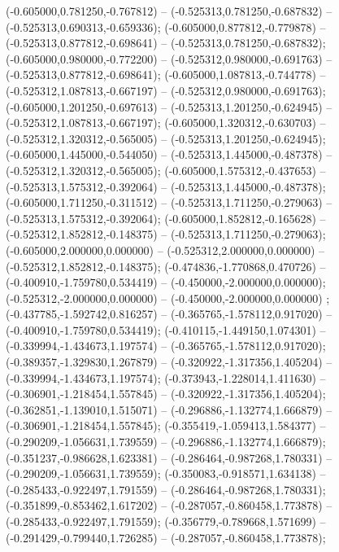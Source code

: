  (-0.605000,0.781250,-0.767812) -- (-0.525313,0.781250,-0.687832) -- (-0.525313,0.690313,-0.659336);
 (-0.605000,0.877812,-0.779878) -- (-0.525313,0.877812,-0.698641) -- (-0.525313,0.781250,-0.687832);
 (-0.605000,0.980000,-0.772200) -- (-0.525312,0.980000,-0.691763) -- (-0.525313,0.877812,-0.698641);
 (-0.605000,1.087813,-0.744778) -- (-0.525312,1.087813,-0.667197) -- (-0.525312,0.980000,-0.691763);
 (-0.605000,1.201250,-0.697613) -- (-0.525313,1.201250,-0.624945) -- (-0.525312,1.087813,-0.667197);
 (-0.605000,1.320312,-0.630703) -- (-0.525312,1.320312,-0.565005) -- (-0.525313,1.201250,-0.624945);
 (-0.605000,1.445000,-0.544050) -- (-0.525313,1.445000,-0.487378) -- (-0.525312,1.320312,-0.565005);
 (-0.605000,1.575312,-0.437653) -- (-0.525313,1.575312,-0.392064) -- (-0.525313,1.445000,-0.487378);
 (-0.605000,1.711250,-0.311512) -- (-0.525313,1.711250,-0.279063) -- (-0.525313,1.575312,-0.392064);
 (-0.605000,1.852812,-0.165628) -- (-0.525312,1.852812,-0.148375) -- (-0.525313,1.711250,-0.279063);
 (-0.605000,2.000000,0.000000) -- (-0.525312,2.000000,0.000000) -- (-0.525312,1.852812,-0.148375);
 (-0.474836,-1.770868,0.470726) -- (-0.400910,-1.759780,0.534419) -- (-0.450000,-2.000000,0.000000);
 (-0.525312,-2.000000,0.000000) -- (-0.450000,-2.000000,0.000000) ;
 (-0.437785,-1.592742,0.816257) -- (-0.365765,-1.578112,0.917020) -- (-0.400910,-1.759780,0.534419);
 (-0.410115,-1.449150,1.074301) -- (-0.339994,-1.434673,1.197574) -- (-0.365765,-1.578112,0.917020);
 (-0.389357,-1.329830,1.267879) -- (-0.320922,-1.317356,1.405204) -- (-0.339994,-1.434673,1.197574);
 (-0.373943,-1.228014,1.411630) -- (-0.306901,-1.218454,1.557845) -- (-0.320922,-1.317356,1.405204);
 (-0.362851,-1.139010,1.515071) -- (-0.296886,-1.132774,1.666879) -- (-0.306901,-1.218454,1.557845);
 (-0.355419,-1.059413,1.584377) -- (-0.290209,-1.056631,1.739559) -- (-0.296886,-1.132774,1.666879);
 (-0.351237,-0.986628,1.623381) -- (-0.286464,-0.987268,1.780331) -- (-0.290209,-1.056631,1.739559);
 (-0.350083,-0.918571,1.634138) -- (-0.285433,-0.922497,1.791559) -- (-0.286464,-0.987268,1.780331);
 (-0.351899,-0.853462,1.617202) -- (-0.287057,-0.860458,1.773878) -- (-0.285433,-0.922497,1.791559);
 (-0.356779,-0.789668,1.571699) -- (-0.291429,-0.799440,1.726285) -- (-0.287057,-0.860458,1.773878);
